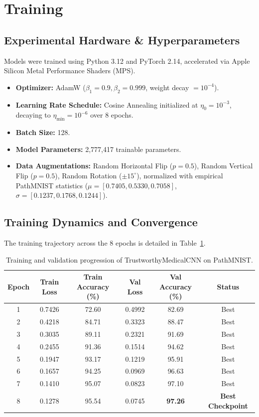 \documentclass[11pt,a4paper]{article}
\begin{document}
\section{Training}
\subsection{Experimental Hardware \& Hyperparameters}
Models were trained using Python 3.12 and PyTorch 2.14, accelerated via Apple Silicon Metal Performance Shaders (MPS).
\begin{itemize}[leftmargin=*]
    \item \textbf{Optimizer:} AdamW ($\beta_1 = 0.9, \beta_2 = 0.999$, weight decay $= 10^{-4}$).
    \item \textbf{Learning Rate Schedule:} Cosine Annealing initialized at $\eta_0 = 10^{-3}$, decaying to $\eta_{\min} = 10^{-6}$ over 8 epochs.
    \item \textbf{Batch Size:} 128.
    \item \textbf{Model Parameters:} 2,777,417 trainable parameters.
    \item \textbf{Data Augmentations:} Random Horizontal Flip ($p=0.5$), Random Vertical Flip ($p=0.5$), Random Rotation ($\pm 15^{\circ}$), normalized with empirical PathMNIST statistics ($\mu = [0.7405, 0.5330, 0.7058]$, $\sigma = [0.1237, 0.1768, 0.1244]$).
\end{itemize}

\subsection{Training Dynamics and Convergence}
The training trajectory across the 8 epochs is detailed in Table~\ref{tab:training_dynamics}.

\begin{table}[H]
\centering
\small
\begin{tabular}{cccccc}
\toprule
\textbf{Epoch} & \textbf{Train Loss} & \textbf{Train Accuracy (\%)} & \textbf{Val Loss} & \textbf{Val Accuracy (\%)} & \textbf{Status} \\
\midrule
1 & 0.7426 & 72.60 & 0.4992 & 82.69 & Best \\
2 & 0.4218 & 84.71 & 0.3323 & 88.47 & Best \\
3 & 0.3035 & 89.11 & 0.2321 & 91.69 & Best \\
4 & 0.2455 & 91.36 & 0.1514 & 94.62 & Best \\
5 & 0.1947 & 93.17 & 0.1219 & 95.91 & Best \\
6 & 0.1657 & 94.25 & 0.0969 & 96.63 & Best \\
7 & 0.1410 & 95.07 & 0.0823 & 97.10 & Best \\
8 & 0.1278 & 95.54 & 0.0745 & \textbf{97.26} & \textbf{Best Checkpoint} \\
\bottomrule
\end{tabular}
\caption{Training and validation progression of TrustworthyMedicalCNN on PathMNIST.}
\label{tab:training_dynamics}
\end{table}
\end{document}
